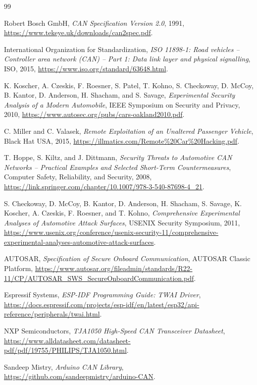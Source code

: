 \renewcommand{\bibname}{Tài liệu tham khảo}

\begin{thebibliography}{99}
\raggedright
\small
\setlength{\itemsep}{1pt}
\setlength{\parskip}{0pt}
\enlargethispage{3\baselineskip}

Robert Bosch GmbH, \textit{CAN Specification Version 2.0}, 1991, \url{https://www.tekeye.uk/downloads/can2spec.pdf}.

International Organization for Standardization, \textit{ISO 11898-1: Road vehicles -- Controller area network (CAN) -- Part 1: Data link layer and physical signalling}, ISO, 2015, \url{https://www.iso.org/standard/63648.html}.

K. Koscher, A. Czeskis, F. Roesner, S. Patel, T. Kohno, S. Checkoway, D. McCoy, B. Kantor, D. Anderson, H. Shacham, and S. Savage, \textit{Experimental Security Analysis of a Modern Automobile}, IEEE Symposium on Security and Privacy, 2010, \url{https://www.autosec.org/pubs/cars-oakland2010.pdf}.

C. Miller and C. Valasek, \textit{Remote Exploitation of an Unaltered Passenger Vehicle}, Black Hat USA, 2015, \url{https://illmatics.com/Remote\%20Car\%20Hacking.pdf}.

T. Hoppe, S. Kiltz, and J. Dittmann, \textit{Security Threats to Automotive CAN Networks -- Practical Examples and Selected Short-Term Countermeasures}, Computer Safety, Reliability, and Security, 2008, \url{https://link.springer.com/chapter/10.1007/978-3-540-87698-4_21}.

S. Checkoway, D. McCoy, B. Kantor, D. Anderson, H. Shacham, S. Savage, K. Koscher, A. Czeskis, F. Roesner, and T. Kohno, \textit{Comprehensive Experimental Analyses of Automotive Attack Surfaces}, USENIX Security Symposium, 2011, \url{https://www.usenix.org/conference/usenix-security-11/comprehensive-experimental-analyses-automotive-attack-surfaces}.

AUTOSAR, \textit{Specification of Secure Onboard Communication}, AUTOSAR Classic Platform, \url{https://www.autosar.org/fileadmin/standards/R22-11/CP/AUTOSAR_SWS_SecureOnboardCommunication.pdf}.

Espressif Systems, \textit{ESP-IDF Programming Guide: TWAI Driver}, \url{https://docs.espressif.com/projects/esp-idf/en/latest/esp32/api-reference/peripherals/twai.html}.

NXP Semiconductors, \textit{TJA1050 High-Speed CAN Transceiver Datasheet}, \url{https://www.alldatasheet.com/datasheet-pdf/pdf/19755/PHILIPS/TJA1050.html}.

Sandeep Mistry, \textit{Arduino CAN Library}, \url{https://github.com/sandeepmistry/arduino-CAN}.

\end{thebibliography}
